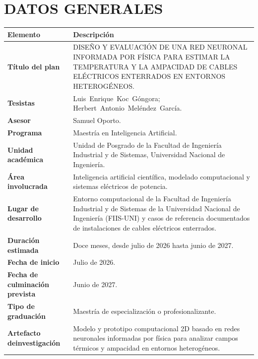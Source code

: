 \documentclass[11pt,a4paper,oneside]{report}
\newcommand{\tesisbodyfont}{\fontsize{11}{13.6}\selectfont}
\renewcommand{\arraystretch}{1.18}
\newcommand{\tituloTesis}{DISEÑO Y EVALUACIÓN DE UNA RED NEURONAL INFORMADA POR FÍSICA PARA ESTIMAR LA TEMPERATURA Y LA AMPACIDAD DE CABLES ELÉCTRICOS ENTERRADOS EN ENTORNOS HETEROGÉNEOS}
\begin{document}
\tesisbodyfont
\hypersetup{pageanchor=true}
\setcounter{page}{2}

\chapter*{DATOS GENERALES}
\vspace{0.35cm}

\begingroup
\singlespacing
\setlength{\parskip}{0pt}
\setlength{\parindent}{0pt}
\setlength{\tabcolsep}{10pt}
\renewcommand{\arraystretch}{1.28}
\noindent
\begin{tabularx}{\textwidth}{
  >{\bfseries\RaggedRight\setlength{\parindent}{0pt}\arraybackslash}p{4.15cm}
  J
}
\toprule
{}
\textbf{Elemento} & \textbf{Descripción} \\
\midrule
Título del plan & \tituloTesis. \\
\addlinespace[5pt]
Tesistas & \mbox{Luis Enrique Koc Góngora};\newline
           \mbox{Herbert Antonio Meléndez García}. \\
\addlinespace[5pt]
Asesor & Samuel Oporto. \\
\addlinespace[5pt]
Programa & Maestría en Inteligencia Artificial. \\
\addlinespace[5pt]
Unidad académica & Unidad de Posgrado de la Facultad de Ingeniería Industrial y de Sistemas, Universidad Nacional de Ingeniería. \\
\addlinespace[5pt]
Área involucrada & Inteligencia artificial científica, modelado computacional y sistemas eléctricos de potencia. \\
\addlinespace[5pt]
Lugar de desarrollo & Entorno computacional de la Facultad de Ingeniería Industrial y de Sistemas de la Universidad Nacional de Ingeniería (FIIS-UNI) y casos de referencia documentados de instalaciones de cables eléctricos enterrados. \\
\addlinespace[5pt]
Duración estimada & Doce meses, desde julio de 2026 hasta junio de 2027. \\
\addlinespace[5pt]
Fecha de inicio & Julio de 2026. \\
\addlinespace[5pt]
Fecha de culminación prevista & Junio de 2027. \\
\addlinespace[5pt]
Tipo de graduación & Maestría de especialización o profesionalizante. \\
\addlinespace[5pt]
Artefacto de\newline investigación & Modelo y prototipo computacional 2D basado en redes neuronales informadas por física para analizar campos térmicos y ampacidad en entornos heterogéneos. \\
\bottomrule
\end{tabularx}
\endgroup
\end{document}
